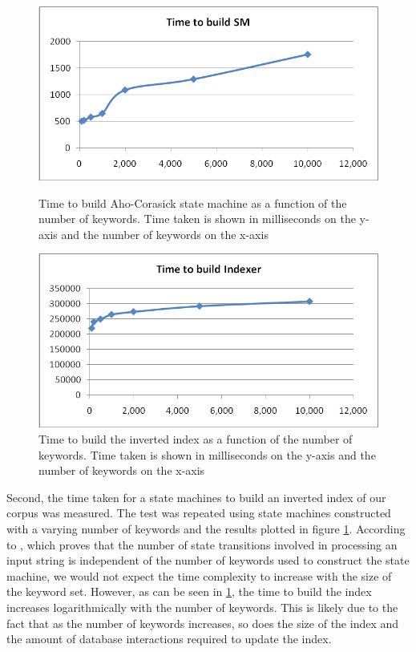 \documentclass[10pt]{article}
\begin{document}
\begin{figure}[ht]
  \begin{minipage}[b]{0.5\linewidth}
    \centering
    \includegraphics[width=\textwidth]{numkeywordstimecomplexbuildsm}
    \caption{Time to build Aho-Corasick state machine as a function of
      the number of keywords. Time taken is shown in milliseconds on the
      y-axis and the number of keywords on the x-axis}
    \label{fig:numkeywordstimecomplexbuildsm}
  \end{minipage}
  \hspace{0.5cm}
  \begin{minipage}[b]{0.5\linewidth}
    \centering
    \includegraphics[width=\textwidth]{numkeywordstimecomplexbuildindex}
    \caption{Time to build the inverted index as a function of the
      number of keywords. Time taken is shown in milliseconds on the
      y-axis and the number of keywords on the x-axis}
    \label{fig:numkeywordstimecomplexbuildindex}
  \end{minipage}
\end{figure}


Second, the time taken for a state machines to build an inverted index
of our corpus was measured. The test was repeated using state machines
constructed with a varying number of keywords and the results plotted
in figure \ref{fig:numkeywordstimecomplexbuildindex}. According to
\cite{RefWorks:103}, which proves that the number of state transitions
involved in processing an input string is independent of the number of
keywords used to construct the state machine, we would not expect the
time complexity to increase with the size of the keyword set. However,
as can be seen in \ref{fig:numkeywordstimecomplexbuildindex}, the time
to build the index increases logarithmically with the number of
keywords. This is likely due to the fact that as the number of
keywords increases, so does the size of the index and the amount of
database interactions required to update the index. 
\end{document}
